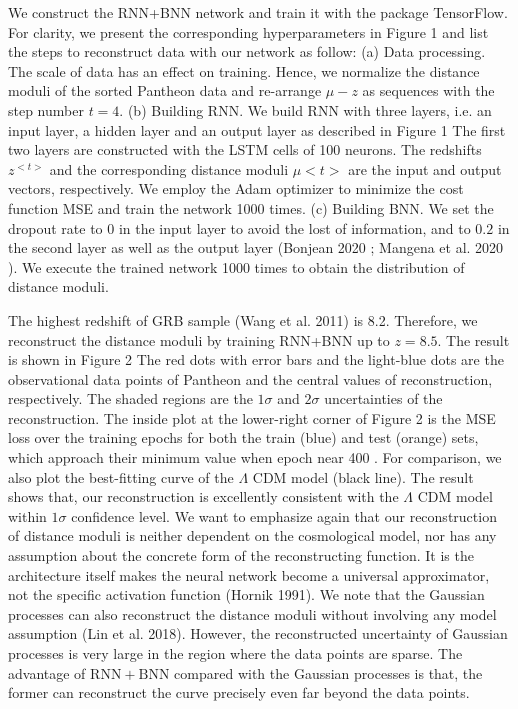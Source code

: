 \documentclass[10pt, a4paper]{article}
\begin{document}
We construct the RNN+BNN network and train it with the package TensorFlow. For clarity, we present the corresponding hyperparameters in Figure 1 and list the steps to reconstruct data with our network as follow: (a) Data processing. The scale of data has an effect on training. Hence, we normalize the distance moduli of the sorted Pantheon data and re-arrange $\mu-z$ as sequences with the step number $t=4$. (b) Building RNN. We build RNN with three layers, i.e. an input layer, a hidden layer and an output layer as described in Figure 1 The first two layers are constructed with the LSTM cells of 100 neurons. The redshifts $z^{<t>}$ and the corresponding distance moduli $\mu<t>$ are the input and output vectors, respectively. We employ the Adam optimizer to minimize the cost function MSE and train the network 1000 times. (c) Building BNN. We set the dropout rate to 0 in the input layer to avoid the lost of information, and to $0.2$ in the second layer as well as the output layer (Bonjean 2020 ; Mangena et al. 2020 ). We execute the trained network 1000 times to obtain the distribution of distance moduli.

The highest redshift of GRB sample (Wang et al. 2011) is 8.2. Therefore, we reconstruct the distance moduli by training RNN+BNN up to $z=8.5$. The result is shown in Figure 2 The red dots with error bars and the light-blue dots are the observational data points of Pantheon and the central values of reconstruction, respectively. The shaded regions are the $1 \sigma$ and $2 \sigma$ uncertainties of the reconstruction. The inside plot at the lower-right corner of Figure 2 is the MSE loss over the training epochs for both the train (blue) and test (orange) sets, which approach their minimum value when epoch near 400 . For comparison, we also plot the best-fitting curve of the $\Lambda$ CDM model (black line). The result shows that, our reconstruction is excellently consistent with the $\Lambda$ CDM model within $1 \sigma$ confidence level. We want to emphasize again that our reconstruction of distance moduli is neither dependent on the cosmological model, nor has any assumption about the concrete form of the reconstructing function. It is the architecture itself makes the neural network become a universal approximator, not the specific activation function (Hornik 1991). We note that the Gaussian processes can also reconstruct the distance moduli without involving any model assumption (Lin et al. 2018). However, the reconstructed uncertainty of Gaussian processes is very large in the region where the data points are sparse. The advantage of $\mathrm{RNN}+\mathrm{BNN}$ compared with the Gaussian processes is that, the former can reconstruct the curve precisely even far beyond the data points.
\end{document}
